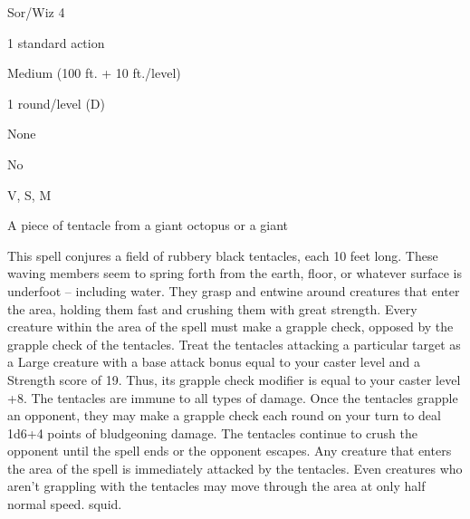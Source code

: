 
\begin{description*}
\item[Level:] Sor/Wiz 4
\item[Casting Time:] 1 standard action
\item[Range:] Medium (100 ft. + 10 ft./level)
\item[Duration:] 1 round/level (D)
\item[Saving Throw:] None
\item[Spell Resistance:] No
\item[Components:] V, S, M
\item[Arcane Material Component:] A piece of tentacle from a giant octopus or a giant
\end{description*}

This spell conjures a field of rubbery black tentacles, each 10 feet long. These
waving members seem to spring forth from the earth, floor, or whatever surface
is underfoot -- including water. They grasp and entwine around creatures that enter
the area, holding them fast and crushing them with great strength.
Every creature within the area of the spell must make a grapple check, opposed
by the grapple check of the tentacles. Treat the tentacles attacking a particular
target as a Large creature with a base attack bonus equal to your caster level
and a Strength score of 19. Thus, its grapple check modifier is equal to your caster
level +8. The tentacles are immune to all types of damage.
Once the tentacles grapple an opponent, they may make a grapple check each round
on your turn to deal 1d6+4 points of bludgeoning damage. The tentacles continue
to crush the opponent until the spell ends or the opponent escapes.
Any creature that enters the area of the spell is immediately attacked by the tentacles.
Even creatures who aren't grappling with the tentacles may move through the area
at only half normal speed.
squid.